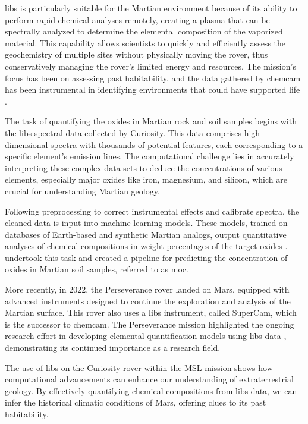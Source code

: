 \gls{libs} is particularly suitable for the Martian environment because of its ability to perform rapid chemical analyses remotely, creating a plasma that can be spectrally analyzed to determine the elemental composition of the vaporized material.
This capability allows scientists to quickly and efficiently assess the geochemistry of multiple sites without physically moving the rover, thus conservatively managing the rover's limited energy and resources.
The mission's focus has been on assessing past habitability, and the data gathered by \gls{chemcam} has been instrumental in identifying environments that could have supported life \cite{chemcamNasaWebsite, curiosityNasaWebsite}.

The task of quantifying the oxides in Martian rock and soil samples begins with the \gls{libs} spectral data collected by Curiosity.
This data comprises high-dimensional spectra with thousands of potential features, each corresponding to a specific element's emission lines.
The computational challenge lies in accurately interpreting these complex data sets to deduce the concentrations of various elements, especially major oxides like iron, magnesium, and silicon, which are crucial for understanding Martian geology.

Following preprocessing to correct instrumental effects and calibrate spectra, the cleaned data is input into machine learning models.
These models, trained on databases of Earth-based and synthetic Martian analogs, output quantitative analyses of chemical compositions in weight percentages of the target oxides \cite{wiensPreflightCalibrationInitial2013, cleggRecalibrationMarsScience2017}.
\citet{cleggRecalibrationMarsScience2017} undertook this task and created a pipeline for predicting the concentration of oxides in Martian soil samples, referred to as \gls{moc}.

More recently, in 2022, the Perseverance rover landed on Mars, equipped with advanced instruments designed to continue the exploration and analysis of the Martian surface.
This rover also uses a \gls{libs} instrument, called SuperCam, which is the successor to \gls{chemcam}.
The Perseverance mission highlighted the ongoing research effort in developing elemental quantification models using \gls{libs} data \cite{andersonPostlandingMajorElement2022}, demonstrating its continued importance as a research field.

The use of \gls{libs} on the Curiosity rover within the MSL mission shows how computational advancements can enhance our understanding of extraterrestrial geology.
By effectively quantifying chemical compositions from \gls{libs} data, we can infer the historical climatic conditions of Mars, offering clues to its past habitability.
